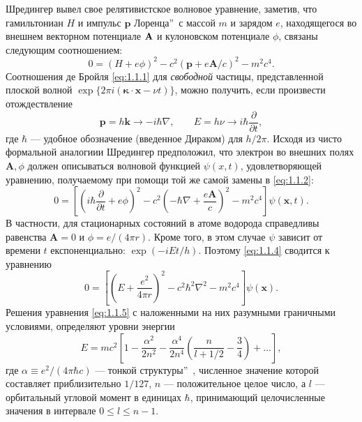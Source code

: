 \documentclass[a5paper,8pt]{article}
\begin{document}
Шредингер вывел свое релятивистское волновое уравнение, заметив, что гамильтониан $H$ и импульс $\textbf{p}$  Лоренца\textquotedblright\ с массой $m$ и зарядом $e$, находящегося во внешнем векторном потенциале $\vb{A}$ и кулоновском потенциале $\phi$, связаны следующим соотношением:
\begin{equation}
    0 = (H + e \phi)^2 - c^2 (\textbf{p} + e \textbf{A}/c)^2 - m^2 c^4. \label{eq:1.1.2}
\end{equation}
Соотношения де Бройля \eqref{eq:1.1.1} для \textit{свободной} частицы, представленной плоской волной $\exp \{ 2 \pi i (\boldsymbol{\kappa} \cdot \textbf{x} - \nu t) \}$, можно получить, если произвести отождествление
\begin{equation}
    \textbf{p} = h \textbf{k} \rightarrow -i \hbar \nabla, \;\;\;\;\;\;\; E = h \nu \rightarrow i \hbar \frac{\partial}{\partial t}, \label{eq:1.1.3}
\end{equation}
где $\hbar$ --- удобное обозначение (введенное Дираком) для $h / 2 \pi$. Исходя из чисто формальной аналогиии Шредингер предположил, что электрон во внешних полях $\textbf{A}, \phi$ должен описываться волновой функцией $\psi (x, t)$, удовлетворяющей уравнению, получаемому при помощи той же самой замены в \eqref{eq:1.1.2}:
\begin{equation}
    0 = \left[\left(i \hbar \frac{\partial}{\partial t} + e \phi \right)^2 - c^2 \left(- \hbar \nabla + \frac{e \textbf{A}}{c} \right)^2 - m^2 c^4\right] \psi(\textbf{x}, t). \label{eq:1.1.4}
\end{equation}
В частности, для стационарных состояний в атоме водорода справедливы равенства $\textbf{A} = 0$ и $\phi = e/(4 \pi r)$. Кроме того, в этом случае $\psi$ зависит от времени $t$ експоненциально: $\exp (-i E t / h)$. Поэтому \eqref{eq:1.1.4} сводится к уравнению
\begin{equation}
    0 = \left[\left(E + \frac{e^2}{4 \pi r} \right)^2 - c^2 \hbar^2 \nabla^2  - m^2 c^4\right] \psi(\textbf{x}). \label{eq:1.1.5}
\end{equation}
Решения уравнения \eqref{eq:1.1.5} с наложенными на них разумными граничными условиями, определяют уровни энергии \cite{book:9}
\begin{equation}
    E = mc^2 \left[ 1 - \frac{\alpha^2}{2n^2} - \frac{\alpha^4}{2n^4} \left( \frac{n}{l + 1/2} - \frac{3}{4} \right) + ... \right], \label{eq:1.1.6}
\end{equation}
где $\alpha \equiv e^2 / (4 \pi \hbar c)$ ---  тонкой структуры\textquotedblright\ , численное значение которой составляет приблизительно $1/127$, $n$ --- положительное целое число, а $l$ --- орбитальный угловой момент в единицах $\hbar$, принимающий целочисленные значения в интервале $0 \le l \le n-1$.
\end{document}
